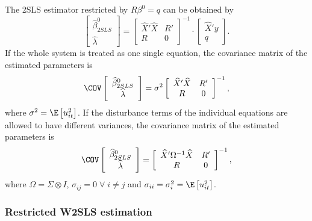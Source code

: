 The 2SLS estimator restricted by $R \beta^0 = q$ can be obtained by
\begin{equation}
   \left[ \begin{array}{c}
      \widehat{\beta}^0_{2SLS} \\ \widehat{\lambda}
   \end{array} \right]
   =
   \left[ \begin{array}{cc}
      \widehat{X}' \widehat{X} & R' \\ 
      R & 0
   \end{array} \right]^{-1}
   \cdot
   \left[ \begin{array}{c}
      \widehat{X}' y \\ q 
   \end{array} \right] .
   \label{eq:beta2SLSr}
\end{equation}
If the whole system is treated as one single equation,
the covariance matrix of the estimated parameters is
\begin{equation}
   \COV
   \left[ \begin{array}{c}
      \widehat{\beta}^0_{2SLS} \\ \widehat{\lambda}
   \end{array} \right] 
   = \sigma^2 
   \left[ \begin{array}{cc}
      \widehat{X}' \widehat{X} & R' \\ 
      R & 0
   \end{array} \right]^{-1} ,
\end{equation}
where $\sigma^2 = \E \left[ u_{it}^2 \right]$.
If the disturbance terms of the individual equations
are allowed to have different variances, 
the covariance matrix of the estimated parameters is
\begin{equation}
   \COV
   \left[ \begin{array}{c}
      \widehat{\beta}^0_{2SLS} \\ \widehat{\lambda}
   \end{array} \right] 
   = 
   \left[ \begin{array}{cc}
      \widehat{X}' \Omega^{-1} \widehat{X} & R' \\ 
      R & 0
   \end{array} \right]^{-1} ,
\end{equation}
where $\Omega = \Sigma \otimes I$,
$\sigma_{ij} = 0 \; \forall \; i \neq j$ and
$\sigma_{ii} = \sigma_i^2 = \E \left[ u_{it}^2 \right]$.


\subsubsection{Restricted W2SLS estimation}

